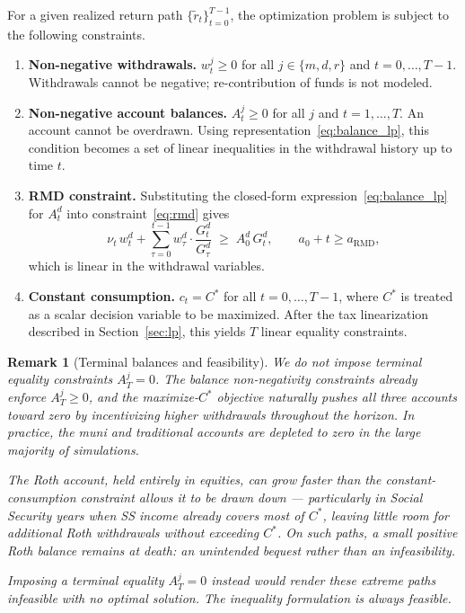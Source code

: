 \documentclass[12pt]{article}
\newtheorem{remark}{Remark}
\newcommand{\Copt}{C^{*}}
\begin{document}
For a given realized return path $\{\tilde{r}_t\}_{t=0}^{T-1}$, the
optimization problem is subject to the following constraints.

\begin{enumerate}[label=(\roman*), leftmargin=2em]
  \item \textbf{Non-negative withdrawals.}
        $w^j_t \geq 0$ for all $j \in \{m, d, r\}$ and $t = 0, \ldots, T-1$.
        Withdrawals cannot be negative; re-contribution of funds is not modeled.

  \item \textbf{Non-negative account balances.}
        $A^j_t \geq 0$ for all $j$ and $t = 1, \ldots, T$. An account
        cannot be overdrawn. Using representation~\eqref{eq:balance_lp},
        this condition becomes a set of linear inequalities in the withdrawal
        history up to time $t$.

  \item \textbf{RMD constraint.}
        Substituting the closed-form expression~\eqref{eq:balance_lp} for
        $A^d_t$ into constraint~\eqref{eq:rmd} gives
        \begin{equation}
          \nu_t\,w^d_t + \sum_{\tau=0}^{t-1} w^d_\tau \cdot
          \frac{G^d_t}{G^d_\tau}
          \;\geq\; A^d_0\,G^d_t,
          \qquad a_0 + t \geq a_{\mathrm{RMD}},
          \label{eq:rmd_lp}
        \end{equation}
        which is linear in the withdrawal variables.

  \item \textbf{Constant consumption.}
        $c_t = \Copt$ for all $t = 0, \ldots, T-1$, where $\Copt$ is treated
        as a scalar decision variable to be maximized. After the tax
        linearization described in Section~\ref{sec:lp}, this yields $T$
        linear equality constraints.
\end{enumerate}

\begin{remark}[Terminal balances and feasibility]
  \label{rem:terminal}
  We do \emph{not} impose terminal equality constraints $A^j_T = 0$.
  The balance non-negativity constraints already enforce $A^j_T \geq 0$,
  and the maximize-$\Copt$ objective naturally pushes all three accounts
  toward zero by incentivizing higher withdrawals throughout the horizon.
  In practice, the muni and traditional accounts are depleted to zero in
  the large majority of simulations.

  The Roth account, held entirely in equities, can grow faster than the
  constant-consumption constraint allows it to be drawn down --- particularly
  in Social Security years when SS income already covers most of $\Copt$,
  leaving little room for additional Roth withdrawals without exceeding $\Copt$.
  On such paths, a small positive Roth balance remains at death: an
  unintended bequest rather than an infeasibility.

  Imposing a terminal equality $A^j_T = 0$ instead would render these
  extreme paths infeasible with no optimal solution. The inequality
  formulation is always feasible.
\end{remark}
\end{document}
